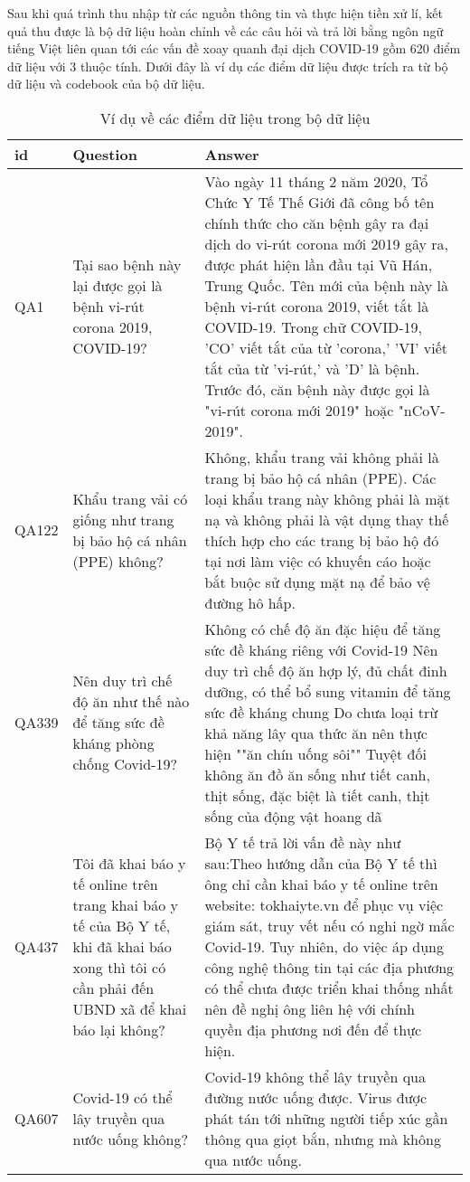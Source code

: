 \documentclass[runningheads]{llncs}
\begin{document}
Sau khi quá trình thu nhập từ các nguồn thông tin và thực hiện tiền xử lí, kết quả thu được là bộ dữ liệu hoàn chỉnh về các câu hỏi và trả lời bằng ngôn ngữ tiếng Việt liên quan tới các vấn đề xoay quanh đại dịch COVID-19 gồm 620 điểm dữ liệu với 3 thuộc tính. Dưới đây là ví dụ các điểm dữ liệu được trích ra từ bộ dữ liệu và codebook của bộ dữ liệu.

\begin{table}
	\setlength{\tabcolsep}{0.5em}
	\renewcommand{\arraystretch}{1.4}
	\begin{center}
	\caption{Ví dụ về các điểm dữ liệu trong bộ dữ liệu}\label{tab4}
		\begin{tabular}{ | p{1.25cm} | p{5cm} | p{5cm} |} 
			\hline
    		\textbf{id} & \textbf{Question} & \textbf{Answer}\\ 
			\hline
			QA1 & Tại sao bệnh này lại được gọi là bệnh vi-rút corona 2019, COVID-19?&Vào ngày 11 tháng 2 năm 2020, Tổ Chức Y Tế Thế Giới đã công bố tên chính thức cho căn bệnh gây ra đại dịch do vi-rút corona mới 2019 gây ra, được phát hiện lần đầu tại Vũ Hán, Trung Quốc. Tên mới của bệnh này là bệnh vi-rút corona 2019, viết tắt là COVID-19. Trong chữ COVID-19, 'CO' viết tắt của từ 'corona,' 'VI' viết tắt của từ 'vi-rút,' và 'D' là bệnh. Trước đó, căn bệnh này được gọi là "vi-rút corona mới 2019" hoặc "nCoV-2019".
			\\ 
			\hline
			QA122&Khẩu trang vải có giống như trang bị bảo hộ cá nhân (PPE) không?&Không, khẩu trang vải không phải là trang bị bảo hộ cá nhân (PPE). Các loại khẩu trang này không phải là mặt nạ và không phải là vật dụng thay thế thích hợp cho các trang bị bảo hộ đó tại nơi làm việc có khuyến cáo hoặc bắt buộc sử dụng mặt nạ để bảo vệ đường hô hấp.
			\\
			\hline
			QA339&Nên duy trì chế độ ăn như thế nào để tăng sức đề kháng phòng chống Covid-19?&Không có chế độ ăn đặc hiệu để tăng sức đề kháng riêng với Covid-19  
			Nên duy trì chế độ ăn hợp lý, đủ chất đinh dưỡng, có thể bổ sung vitamin để tăng sức đề kháng chung Do chưa loại trừ khả năng lây qua thức ăn nên thực hiện ""ăn chín uống sôi"" Tuyệt đối không ăn đồ ăn sống như tiết canh, thịt sống, đặc biệt là tiết canh, thịt sống của động vật hoang dã\\
			\hline
			QA437&Tôi đã khai báo y tế online trên trang khai báo y tế của Bộ Y tế, khi đã khai báo xong thì tôi có cần phải đến UBND xã để khai báo lại không?&Bộ Y tế trả lời vấn đề này như sau:Theo hướng dẫn của Bộ Y tế thì ông chỉ cần khai báo y tế online trên website: tokhaiyte.vn để phục vụ việc giám sát, truy vết nếu có nghi ngờ mắc Covid-19. Tuy nhiên, do việc áp dụng công nghệ thông tin tại các địa phương có thể chưa được triển khai thống nhất nên đề nghị ông liên hệ với chính quyền địa phương nơi đến để thực hiện.\\
			\hline
			QA607& Covid-19 có thể lây truyền qua nước uống không? &Covid-19 không thể lây truyền qua đường nước uống được. Virus được phát tán tới những người tiếp xúc gần thông qua giọt bắn, nhưng mà không qua nước uống.\\
			\hline
			\end{tabular}
		\end{center}
\end{table}
\end{document}
